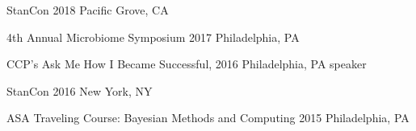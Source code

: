 

\begin{cvconfs}

  \cvconf
    {StanCon} %
    {2018} %
    {Pacific Grove, CA} %
    {}

  \cvconf
    {4th Annual Microbiome Symposium} %
    {2017} %
    {Philadelphia, PA} %
    {}
    
  \cvconf
	{CCP's Ask Me How I Became Successful,}
	{2016}
	{Philadelphia, PA}
	{speaker}

  \cvconf
    {StanCon} %
    {2016} %
    {New York, NY} %
    {}
    
  \cvconf
    {ASA Traveling Course: Bayesian Methods and Computing} %
    {2015} %
    {Philadelphia, PA} %
    {}
\end{cvconfs}


